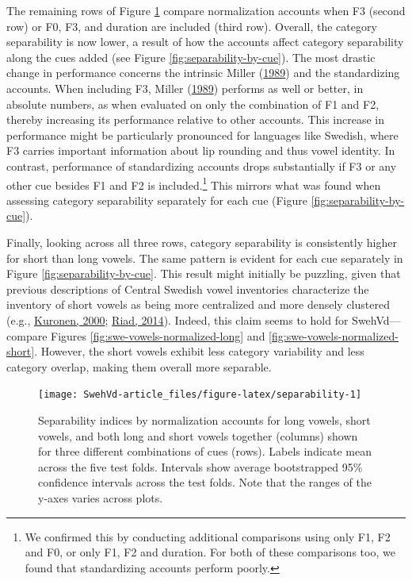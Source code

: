 \documentclass[utf8]{frontiersSCNS}
\begin{document}
The remaining rows of Figure \ref{fig:separability} compare normalization accounts when F3 (second row) or F0, F3, and duration are included (third row). Overall, the category separability is now lower, a result of how the accounts affect category separability along the cues added (see Figure \ref{fig:separability-by-cue}). The most drastic change in performance concerns the intrinsic Miller (\protect\hyperlink{ref-miller1989c}{1989}) and the standardizing accounts. When including F3, Miller (\protect\hyperlink{ref-miller1989c}{1989}) performs as well or better, in absolute numbers, as when evaluated on only the combination of F1 and F2, thereby increasing its performance relative to other accounts. This increase in performance might be particularly pronounced for languages like Swedish, where F3 carries important information about lip rounding and thus vowel identity. In contrast, performance of standardizing accounts drops substantially if F3 or any other cue besides F1 and F2 is included.\footnote{We confirmed this by conducting additional comparisons using only F1, F2 and F0, or only F1, F2 and duration. For both of these comparisons too, we found that standardizing accounts perform poorly.} This mirrors what was found when assessing category separability separately for each cue (Figure \ref{fig:separability-by-cue}).

Finally, looking across all three rows, category separability is consistently higher for short than long vowels. The same pattern is evident for each cue separately in Figure \ref{fig:separability-by-cue}. This result might initially be puzzling, given that previous descriptions of Central Swedish vowel inventories characterize the inventory of short vowels as being more centralized and more densely clustered (e.g., \protect\hyperlink{ref-kuronen2000}{Kuronen, 2000}; \protect\hyperlink{ref-riad2014}{Riad, 2014}). Indeed, this claim seems to hold for SwehVd---compare Figures \ref{fig:swe-vowels-normalized-long} and \ref{fig:swe-vowels-normalized-short}. However, the short vowels exhibit less category variability and less category overlap, making them overall more separable.



\begin{figure}

{\centering \texttt{[image: SwehVd-article\_files/figure-latex/separability-1]} 

}

\caption{Separability indices by normalization accounts for long vowels, short vowels, and both long and short vowels together (columns) shown for three different combinations of cues (rows). Labels indicate mean across the five test folds. Intervals show average bootstrapped 95\% confidence intervals across the test folds. Note that the ranges of the y-axes varies across plots.}\label{fig:separability}
\end{figure}
\end{document}
